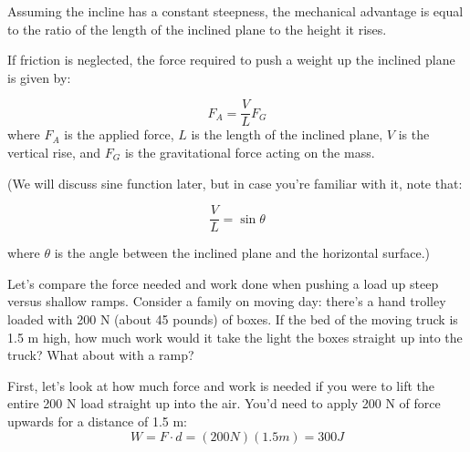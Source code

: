 Assuming the incline has a constant steepness, the mechanical advantage is 
equal to the ratio of the length of the inclined plane to the height it rises. 

If friction is neglected, the force required to push a weight up the inclined 
plane is given by:

\[
F_A = \frac{V}{L} F_G
\]
where \( F_A \) is the applied force, \( L \) is the length of the inclined plane, \( V \) is the vertical rise, and \( F_G \) is the gravitational force acting on the mass.

\begin{center}
\end{center}

(We will discuss sine function later, but in case you're familiar with it, note that:

\[
\frac{V}{L} = \sin{\theta}
\]

where \( \theta \) is the angle between the inclined plane and the horizontal surface.)

Let's compare the force needed and work done when pushing a load up steep 
versus shallow ramps. Consider a family on moving day: there's a hand trolley 
loaded with 200 N (about 45 pounds) of boxes. If the bed of the moving truck is 
1.5 m high, how much work would it take the light the boxes straight up into 
the truck? What about with a ramp? 

First, let's look at how much force and work is needed if you were to lift the 
entire 200 N load straight up into the air. You'd need to apply 200 N of force 
upwards for a distance of 1.5 m:
$$W = F \cdot d = \left( 200 N \right) \left( 1.5 m \right) = 300 J$$

